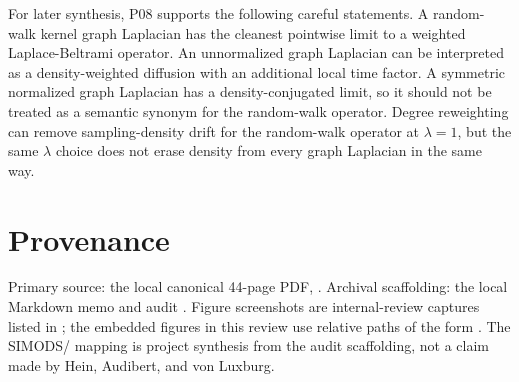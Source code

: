 \documentclass[11pt]{article}
\begin{document}
For later synthesis, P08 supports the following careful statements.  A
random-walk kernel graph Laplacian has the cleanest pointwise limit to a
weighted Laplace-Beltrami operator.  An unnormalized graph Laplacian can be
interpreted as a density-weighted diffusion with an additional local time
factor.  A symmetric normalized graph Laplacian has a density-conjugated
limit, so it should not be treated as a semantic synonym for the random-walk
operator.  Degree reweighting can remove sampling-density drift for the
random-walk operator at $\lambda=1$, but the same $\lambda$ choice does not
erase density from every graph Laplacian in the same way.

\section*{Provenance}

Primary source: the local canonical 44-page PDF,
.
Archival scaffolding: the local Markdown memo
and audit
.
Figure screenshots are internal-review captures listed in
; the embedded figures in this
review use relative paths of the form .  The
SIMODS/ mapping is project synthesis from the audit scaffolding,
not a claim made by Hein, Audibert, and von Luxburg.



\end{document}
